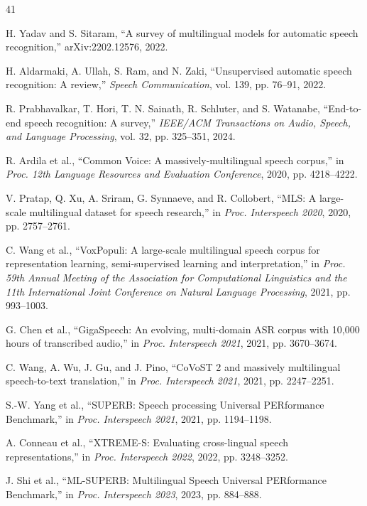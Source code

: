 \documentclass[11pt]{article}
\begin{document}
\begin{thebibliography}{41}

H. Yadav and S. Sitaram, ``A survey of multilingual models for automatic speech recognition,'' arXiv:2202.12576, 2022.

H. Aldarmaki, A. Ullah, S. Ram, and N. Zaki, ``Unsupervised automatic speech recognition: A review,'' \textit{Speech Communication}, vol. 139, pp. 76--91, 2022.

R. Prabhavalkar, T. Hori, T. N. Sainath, R. Schluter, and S. Watanabe, ``End-to-end speech recognition: A survey,'' \textit{IEEE/ACM Transactions on Audio, Speech, and Language Processing}, vol. 32, pp. 325--351, 2024.

R. Ardila et al., ``Common Voice: A massively-multilingual speech corpus,'' in \textit{Proc. 12th Language Resources and Evaluation Conference}, 2020, pp. 4218--4222.

V. Pratap, Q. Xu, A. Sriram, G. Synnaeve, and R. Collobert, ``MLS: A large-scale multilingual dataset for speech research,'' in \textit{Proc. Interspeech 2020}, 2020, pp. 2757--2761.

C. Wang et al., ``VoxPopuli: A large-scale multilingual speech corpus for representation learning, semi-supervised learning and interpretation,'' in \textit{Proc. 59th Annual Meeting of the Association for Computational Linguistics and the 11th International Joint Conference on Natural Language Processing}, 2021, pp. 993--1003.

G. Chen et al., ``GigaSpeech: An evolving, multi-domain ASR corpus with 10,000 hours of transcribed audio,'' in \textit{Proc. Interspeech 2021}, 2021, pp. 3670--3674.

C. Wang, A. Wu, J. Gu, and J. Pino, ``CoVoST 2 and massively multilingual speech-to-text translation,'' in \textit{Proc. Interspeech 2021}, 2021, pp. 2247--2251.

S.-W. Yang et al., ``SUPERB: Speech processing Universal PERformance Benchmark,'' in \textit{Proc. Interspeech 2021}, 2021, pp. 1194--1198.

A. Conneau et al., ``XTREME-S: Evaluating cross-lingual speech representations,'' in \textit{Proc. Interspeech 2022}, 2022, pp. 3248--3252.

J. Shi et al., ``ML-SUPERB: Multilingual Speech Universal PERformance Benchmark,'' in \textit{Proc. Interspeech 2023}, 2023, pp. 884--888.


\end{thebibliography}
\end{document}
